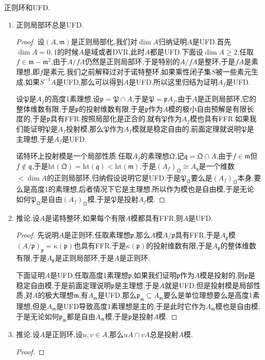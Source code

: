 正则环和UFD.
\begin{enumerate}
	\item 正则局部环总是UFD.
	\begin{proof}
		
		设$(A,\mathfrak{m})$是正则局部化,我们对$\dim A$归纳证明$A$是UFD.首先$\dim A=0,1$的时候$A$是域或者DVR,此时$A$都是UFD.下面设$\dim A\ge2$,任取$f\in\mathfrak{m}-\mathfrak{m}^2$,由于$A/fA$仍然是正则局部环,于是特别的$A/fA$是整环,于是$fA$是素理想,即$f$是素元.我们之前解释过对于诺特整环,如果乘性闭子集$S$被一些素元生成,如果$S^{-1}A$是UFD,那么可以得到$A$是UFD.所以这里归结为证明$A_f$是UFD.
		
		\qquad
		
		设$\mathfrak{P}$是$A_f$的高度1素理想,设$\mathfrak{p}=\mathfrak{P}\cap A$,于是$\mathfrak{P}=\mathfrak{p}A_f$.由于$A$是正则局部环,它的整体维数有限,于是$\mathfrak{p}$的投射维数有限,于是$\mathfrak{p}$作为$A$模的极小自由预解是有限长度的,于是$\mathfrak{p}$具有FFR.按照局部化是正合的,就有$\mathfrak{P}$作为$A_f$模也具有FFR.如果我们能证明$\mathfrak{P}$是$A_f$投射模,那么$\mathfrak{P}$作为$A_f$模就是稳定自由的,前面定理就说明$\mathfrak{P}$是主理想,于是$A_f$是UFD.
		
		\qquad
		
		诺特环上投射模是一个局部性质.任取$A_f$的素理想$\mathfrak{Q}$,记$\mathfrak{q}=\mathfrak{Q}\cap A$,由于$f\in\mathfrak{m}$但$f\not\in\mathfrak{q}$,于是$\mathrm{ht}(\mathfrak{Q})=\mathrm{ht}(\mathfrak{q})<\mathrm{ht}(\mathfrak{m})$.于是$(A_f)_{\mathfrak{Q}}\cong A_{\mathfrak{q}}$是一个维数$<\dim A$的正则局部环,归纳假设说明它是UFD.于是$\mathfrak{P}_{\mathfrak{Q}}$要么是$(A_f)_{\mathfrak{Q}}$本身,要么是高度1的素理想,后者情况下它是主理想,所以作为模也是自由模,于是无论如何$\mathfrak{P}_{\mathfrak{Q}}$是自由$(A_f)_{\mathfrak{Q}}$模,于是$\mathfrak{P}$是投射$A_f$模.
	\end{proof}
    \item 推论.设$A$是诺特整环,如果每个有限$A$模都具有FFR,则$A$是UFD.
    \begin{proof}
    	
    	先说明$A$是正则环.任取素理想$\mathfrak{p}$,那么$A$模$A/\mathfrak{p}$具有FFR,于是$A_{\mathfrak{p}}$模$(A/\mathfrak{p})_{\mathfrak{p}}=\kappa(\mathfrak{p})$也具有FFR.于是$\kappa(\mathfrak{p})$的投射维数有限,于是$A_{\mathfrak{p}}$的整体维数有限,于是$A_{\mathfrak{p}}$是正则局部环,于是$A$是正则环.
    	
    	\qquad
    	
    	下面证明$A$是UFD,任取高度1素理想$\mathfrak{p}$,如果我们证明$\mathfrak{p}$作为$A$模是投射的,则$\mathfrak{p}$是稳定自由模,于是前面定理说明$\mathfrak{p}$是主理想,于是$A$就是UFD.但是投射模是局部性质,对$A$的极大理想$\mathfrak{m}$,有$A_{\mathfrak{m}}$是UFD.那么$\mathfrak{p}_{\mathfrak{m}}\subseteq A_{\mathfrak{m}}$要么是单位理想要么是高度1素理想,但是$A_{\mathfrak{m}}$是UFD导致高度1素理想是主的,于是此时它作为$A_{\mathfrak{m}}$模也是自由模,于是无论如何$\mathfrak{p}_{\mathfrak{m}}$都是自由$A_{\mathfrak{m}}$模,于是$\mathfrak{p}$是投射$A$模.
    \end{proof}
    \item 推论.设$A$是正则环,设$u,v\in A$,那么$uA\cap vA$总是投射$A$模.
    \begin{proof}
    	

\end{proof}
\end{enumerate}
